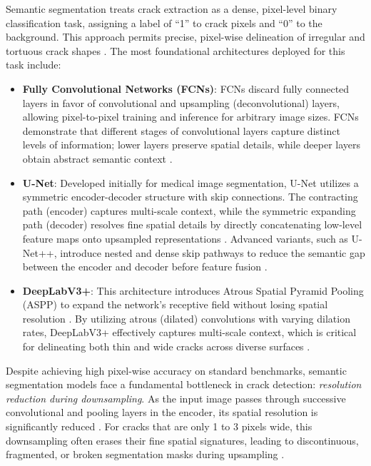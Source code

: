 Semantic segmentation treats crack extraction as a dense, pixel-level binary classification task, assigning a label of ``1'' to crack pixels and ``0'' to the background. This approach permits precise, pixel-wise delineation of irregular and tortuous crack shapes \cite{liu-2019}. The most foundational architectures deployed for this task include:
\begin{itemize}
    \item \textbf{Fully Convolutional Networks (FCNs)}: FCNs discard fully connected layers in favor of convolutional and upsampling (deconvolutional) layers, allowing pixel-to-pixel training and inference for arbitrary image sizes. FCNs demonstrate that different stages of convolutional layers capture distinct levels of information; lower layers preserve spatial details, while deeper layers obtain abstract semantic context \cite{liu-2019}.
    \item \textbf{U-Net}: Developed initially for medical image segmentation, U-Net utilizes a symmetric encoder-decoder structure with skip connections. The contracting path (encoder) captures multi-scale context, while the symmetric expanding path (decoder) resolves fine spatial details by directly concatenating low-level feature maps onto upsampled representations \cite{liu-2019, kirchhoff-2024}. Advanced variants, such as U-Net++, introduce nested and dense skip pathways to reduce the semantic gap between the encoder and decoder before feature fusion \cite{pereira-2025}.
    \item \textbf{DeepLabV3+}: This architecture introduces Atrous Spatial Pyramid Pooling (ASPP) to expand the network's receptive field without losing spatial resolution \cite{goo-2025}. By utilizing atrous (dilated) convolutions with varying dilation rates, DeepLabV3+ effectively captures multi-scale context, which is critical for delineating both thin and wide cracks across diverse surfaces \cite{goo-2025,zhang-2024b}.
\end{itemize}

\hs Despite achieving high pixel-wise accuracy on standard benchmarks, semantic segmentation models face a fundamental bottleneck in crack detection: \textit{resolution reduction during downsampling}. As the input image passes through successive convolutional and pooling layers in the encoder, its spatial resolution is significantly reduced \cite{sohaib-2024}. For cracks that are only 1 to 3 pixels wide, this downsampling often erases their fine spatial signatures, leading to discontinuous, fragmented, or broken segmentation masks during upsampling \cite{zhang-2024b,zhang-2024c}.



